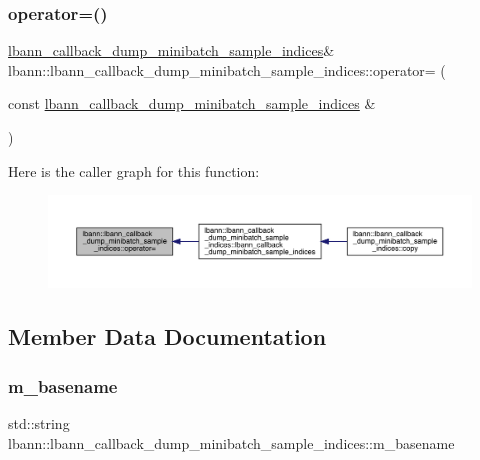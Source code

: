 \subsubsection{\texorpdfstring{operator=()}{operator=()}}
{\footnotesize\ttfamily \hyperlink{classlbann_1_1lbann__callback__dump__minibatch__sample__indices}{lbann\+\_\+callback\+\_\+dump\+\_\+minibatch\+\_\+sample\+\_\+indices}\& lbann\+::lbann\+\_\+callback\+\_\+dump\+\_\+minibatch\+\_\+sample\+\_\+indices\+::operator= (\begin{DoxyParamCaption}\item[{const \hyperlink{classlbann_1_1lbann__callback__dump__minibatch__sample__indices}{lbann\+\_\+callback\+\_\+dump\+\_\+minibatch\+\_\+sample\+\_\+indices} \&}]{ }\end{DoxyParamCaption})\hspace{0.3cm}{\ttfamily [default]}}

Here is the caller graph for this function\+:\nopagebreak
\begin{figure}[H]
\begin{center}
\leavevmode
\includegraphics[width=350pt]{classlbann_1_1lbann__callback__dump__minibatch__sample__indices_aa1db9d6cef232a868110d72e4bc2477a_icgraph}
\end{center}
\end{figure}


\subsection{Member Data Documentation}
\mbox{\label{classlbann_1_1lbann__callback__dump__minibatch__sample__indices_a75ef9a964cb1e1281e4721beef14c265}} 
\subsubsection{\texorpdfstring{m\+\_\+basename}{m\_basename}}
{\footnotesize\ttfamily std\+::string lbann\+::lbann\+\_\+callback\+\_\+dump\+\_\+minibatch\+\_\+sample\+\_\+indices\+::m\+\_\+basename\hspace{0.3cm}{\ttfamily [private]}}

